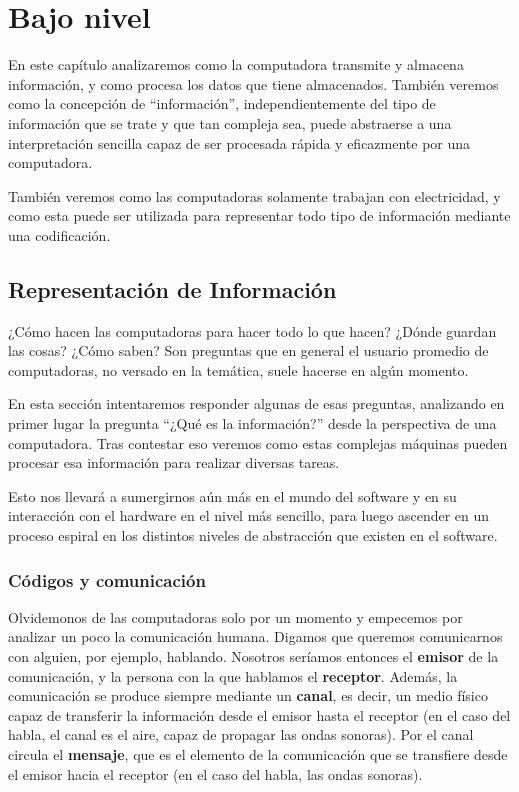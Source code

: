 
\chapter{Bajo nivel}
\label{chap:bajo_nivel}

En este capítulo analizaremos como la computadora transmite y almacena
información, y como procesa los datos que tiene almacenados. También veremos
como la concepción de ``información'', independientemente del tipo de
información que se trate y que tan compleja sea, puede abstraerse a una
interpretación sencilla capaz de ser procesada rápida y eficazmente por una
computadora.

También veremos como las computadoras solamente trabajan con electricidad, y
como esta puede ser utilizada para representar todo tipo de información mediante
una codificación.

\section{Representación de Información}
\label{chap:bajo_nivel:sec:representacion_informacion}

¿Cómo hacen las computadoras para hacer todo lo que hacen? ¿Dónde guardan las
cosas? ¿Cómo saben? Son preguntas que en general el usuario promedio de
computadoras, no versado en la temática, suele hacerse en algún momento.

En esta sección intentaremos responder algunas de esas preguntas, analizando en
primer lugar la pregunta ``¿Qué es la información?'' desde la perspectiva de una
computadora. Tras contestar eso veremos como estas complejas máquinas pueden
procesar esa información para realizar diversas tareas.

Esto nos llevará a sumergirnos aún más en el mundo del software y en su
interacción con el hardware en el nivel más sencillo, para luego ascender en un
proceso espiral en los distintos niveles de abstracción que existen en el
software.

\subsection{Códigos y comunicación}
\label{chap:bajo_nivel:subsec:codigos}

Olvidemonos de las computadoras solo por un momento y empecemos por analizar un
poco la comunicación humana. Digamos que queremos comunicarnos con alguien, por
ejemplo, hablando. Nosotros seríamos entonces el \textbf{emisor} de la
comunicación, y la persona con la que hablamos el \textbf{receptor}. Además, la
comunicación se produce siempre mediante un \textbf{canal}, es decir, un medio
físico capaz de transferir la información desde el emisor hasta el receptor (en
el caso del habla, el canal es el aire, capaz de propagar las ondas sonoras).
Por el canal circula el \textbf{mensaje}, que es el elemento de la comunicación
que se transfiere desde el emisor hacia el receptor (en el caso del habla, las
ondas sonoras).

